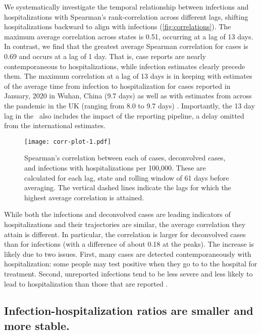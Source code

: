 We systematically investigate the temporal relationship between infections and
hospitalizations with Spearman's rank-correlation across different lags,
shifting hospitalizations backward to align with infections
(\autoref{fig:correlations}). The maximum average correlation across states is
0.51, occurring at a lag of 13 days. In contrast, we find that the greatest
average Spearman correlation for cases is 0.69 and occurs at a lag of 1 day.
That is, case reports are nearly contemporaneous to hospitalizations, while
infection estimates clearly precede them. The maximum correlation at a lag of 13
days is in keeping with estimates of the average time from infection to
hospitalization for cases reported in January, 2020 in Wuhan, China (9.7 days)
as well as with estimates from across the pandemic in the UK (ranging from 8.0
to 9.7 days) \citep{ward2021understanding}. Importantly, the 13 day lag in the
\US\ also includes the impact of the reporting pipeline, a delay omitted from
the international estimates. 

\begin{figure}[!tb]
\centering
\texttt{[image: corr-plot-1.pdf]} 
\caption{Spearman's correlation between each of cases, deconvolved cases, and
infections with hospitalizations per 100,000. These are calculated for each lag,
state and rolling window of 61 days before averaging. The vertical dashed lines
indicate the lags for which the highest average correlation is attained.}
\label{fig:correlations}
\end{figure}
    

While both the infections and deconvolved cases are leading indicators of
hospitalizations and their trajectories are similar, the average correlation
they attain is different. In particular, the correlation is larger for
deconvolved cases than for infections (with a difference of about 0.18 at the
peaks). The increase is likely due to two issues. First, many cases are detected
contemporaneously with hospitalization: some people may test positive when they go to
to the hospital for treatment. Second, unreported infections tend to be
less severe and less likely to lead to hospitalization than those that are
reported \citep{sallahi2021using}.



\subsection{Infection-hospitalization ratios are smaller and more stable.}
\label{sec:ihrs}

